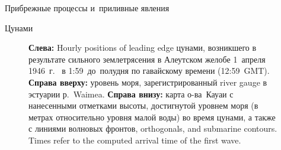 \begin{chapter}{Прибрежные процессы и~приливные явления}
\begin{section}{Цунами}
\begin{figure}[t!]
\caption{\textbf{Слева:} Hourly positions of leading
edge цунами, возникшего в результате
сильного землетрясения в Алеутском желобе 1~апреля 1946~г.\ %
в 1:59~до~полудня по гавайскому времени (12:59~GMT).  
\textbf{Справа вверху:} уровень моря, зарегистрированный 
river gauge в эстуарии р.~Waimea.  
\textbf{Справа внизу:} карта о-ва~Кауаи с нанесенными отметками высоты,
достигнутой уровнем моря (в метрах относительно уровня малой воды)
во время цунами, а также с линиями волновых фронтов, 
orthogonals, and submarine contours. 
Times refer to the computed arrival time of the first wave.~\cite{Shepard:1950}}
\label{fig:tsunami}
\end{figure}
%


\end{section}
\end{chapter}
